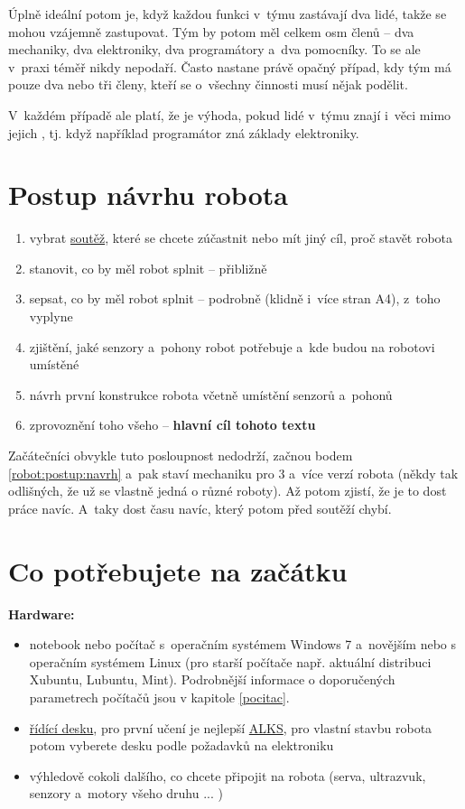 Úplně ideální potom je, když každou funkci v~týmu zastávají dva lidé, takže se mohou vzájemně zastupovat.
Tým by potom měl celkem osm členů -- dva mechaniky, dva elektroniky, dva programátory a~dva pomocníky.
To se ale v~praxi téměř nikdy nepodaří.
Často nastane právě opačný případ, kdy tým má pouze dva nebo tři členy, kteří se o~všechny činnosti musí nějak podělit.

V~každém případě ale platí, že je výhoda, pokud lidé v~týmu znají i~věci mimo jejich , tj. když například programátor zná základy elektroniky.

\section{Postup návrhu robota}

\begin{enumerate} %
\item  vybrat \hyperref[prehled_soutezi]{soutěž}, které se chcete zúčastnit nebo mít jiný cíl, proč stavět robota 
\item  stanovit, co by měl robot splnit -- přibližně 
\item  sepsat, co by měl robot splnit -- podrobně (klidně i~více stran A4), z~toho vyplyne
\item  zjištění, jaké senzory a~pohony robot potřebuje a~kde budou na robotovi umístěné
\item  návrh první konstrukce robota včetně umístění senzorů a~pohonů \label{robot:postup:navrh}
\item  zprovoznění toho všeho -- {\bf hlavní cíl tohoto textu }
\end{enumerate}


Začátečníci obvykle tuto posloupnost nedodrží, začnou bodem \ref{robot:postup:navrh} a~pak staví mechaniku pro 
3 a~více verzí robota (někdy tak odlišných, že už se vlastně jedná o různé roboty). Až potom zjistí, že je to dost práce navíc.
A~taky dost času navíc, který potom před soutěží chybí. 

\section{Co potřebujete na začátku}

{\bf Hardware: }

\begin{itemize} 
\item  notebook nebo počítač s~operačním systémem Windows 7 a~novějším nebo s operačním systémem Linux (pro starší počítače např. aktuální distribuci Xubuntu, Lubuntu, Mint). 
Podrobnější informace o doporučených parametrech počítačů jsou v kapitole \ref{pocitac}.
\item \hyperref[ridici_desky]{řídící desku}, pro první učení je nejlepší \hyperref[alks]{ALKS}, pro vlastní stavbu robota potom vyberete desku podle požadavků na elektroniku  
\item výhledově cokoli dalšího, co chcete připojit na robota (serva, ultrazvuk, senzory a~motory všeho druhu ... )
\end{itemize}


